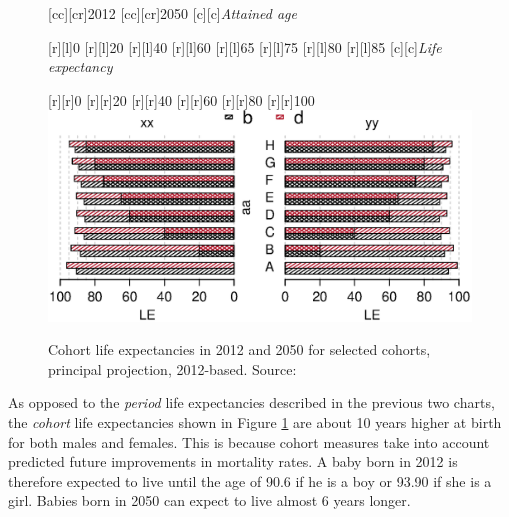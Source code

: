 \documentclass[11 pt, a4paper]{report}
\begin{document}
\begin{figure}[hbtp!]
[cc][cr]{\small{2012}}
[cc][cr]{\small{2050}}
[c][c]{\small{\emph{Attained age}}}

[r][l]{\small{0}}
[r][l]{\small{20}}
[r][l]{\small{40}}
[r][l]{\small{60}}
[r][l]{\small{65}}
[r][l]{\small{75}}
[r][l]{\small{80}}
[r][l]{\small{85}}
[c][c]{\small{\emph{Life expectancy}}}

[r][r]{\small{0}}
[r][r]{\small{20}}
[r][r]{\small{40}}
[r][r]{\small{60}}
[r][r]{\small{80}}
[r][r]{\small{100}}
\includegraphics[width=\textwidth]{../figures/Fig2.6.eps}
\caption{Cohort life expectancies in 2012 and 2050 for selected cohorts, principal projection, 2012-based. Source: \cite{ONS2013c} }
\label{Fig:26}
\end{figure}

As opposed to the \emph{period} life expectancies described in the previous two charts, the \emph{cohort} life expectancies shown in Figure \ref{Fig:26} are about 10 years higher at birth for both males and females.  This is because cohort measures take into account predicted future improvements in mortality rates. A baby born in 2012 is therefore expected to live until the age of 90.6 if he is a boy or 93.90 if she is a girl. Babies born in 2050 can expect to live almost 6 years longer.  
   
\end{document}
